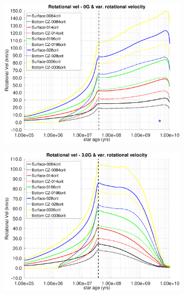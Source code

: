 \documentclass[fleqn,usenatbib]{mnras}
\begin{document}
\begin{figure}
    \centering
    \begin{subfigure}[h]{0.47\textwidth}
    \includegraphics[trim = 10mm 10mm 15mm 10mm, clip,width=\textwidth]{figures/rot_vel_var_vel_0_0g.eps}
    \label{fig:subim41}
    \end{subfigure}
    \begin{subfigure}[h]{0.47\textwidth}
    \includegraphics[trim = 10mm 10mm 15mm 10mm, clip,width=\textwidth]{figures/rot_vel_var_vel_3_0g.eps}
    \label{fig:subim42}
    \end{subfigure}
    \begin{subfigure}[h]{0.47\textwidth}

\end{subfigure}
\end{figure}
\end{document}
